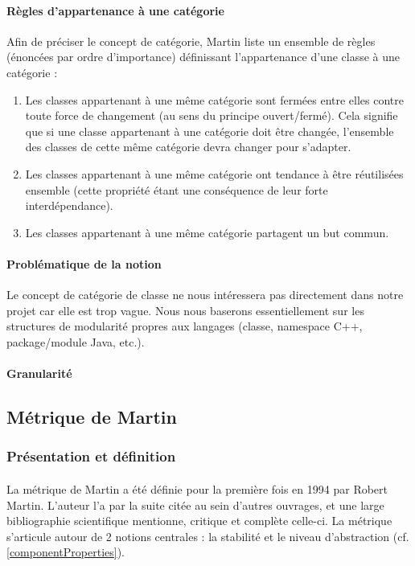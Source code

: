 \documentclass{scrartcl}
\begin{document}
    \paragraph{Règles d'appartenance à une catégorie}Afin de préciser le concept de catégorie, Martin liste un ensemble de règles (énoncées par ordre d'importance) définissant l'appartenance d'une classe à une catégorie :
    \begin{enumerate}
        \item Les classes appartenant à une même catégorie sont fermées entre elles contre toute force de changement (au sens du principe ouvert/fermé). Cela signifie que si une classe appartenant à une catégorie doit être changée, l'ensemble des classes de cette même catégorie devra changer pour s'adapter. 
        \item Les classes appartenant à une même catégorie ont tendance à être réutilisées ensemble (cette propriété étant une conséquence de leur forte interdépendance).
        \item Les classes appartenant à une même catégorie partagent un but commun.
    \end{enumerate}

    \paragraph{Problématique de la notion}Le concept de catégorie de classe ne nous intéressera pas directement dans notre projet car elle est trop vague. Nous nous baserons essentiellement sur les structures de modularité propres aux langages (classe, namespace C++, package/module Java, etc.).
    
    \paragraph{Granularité}

\subsection{Métrique de Martin}
\subsubsection{Présentation et définition}

    \paragraph{}La métrique de Martin a été définie pour la première fois en 1994 par Robert Martin\cite{Martin:1994}. L'auteur l'a par la suite citée au sein d'autres ouvrages\cite{Martin:2003}, et une large bibliographie scientifique mentionne, critique et complète celle-ci\cite{HyryLepp:2009}\cite{BUmetric:2016}\cite{KaurShar:2015}\cite{Spinellis:2006}\cite{Pressman:2000}. La métrique s'articule autour de 2 notions centrales : la stabilité et le niveau d'abstraction (cf. \ref{componentProperties}).
\end{document}
